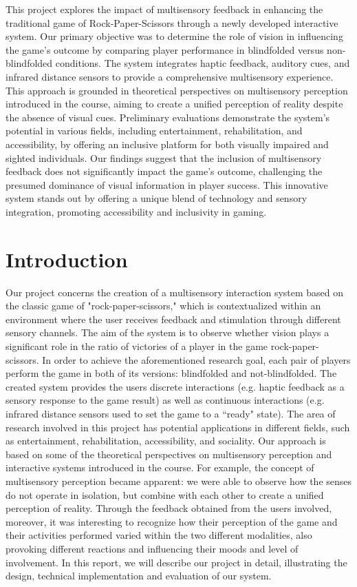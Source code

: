 \documentclass[11pt,a4paper]{report}
\begin{document}
This project explores the impact of multisensory feedback in enhancing the traditional game of Rock-Paper-Scissors through a newly developed interactive system. Our primary objective was to determine the role of vision in influencing the game's outcome by comparing player performance in blindfolded versus non-blindfolded conditions. The system integrates haptic feedback, auditory cues, and infrared distance sensors to provide a comprehensive multisensory experience. This approach is grounded in theoretical perspectives on multisensory perception introduced in the course, aiming to create a unified perception of reality despite the absence of visual cues. Preliminary evaluations demonstrate the system's potential in various fields, including entertainment, rehabilitation, and accessibility, by offering an inclusive platform for both visually impaired and sighted individuals. Our findings suggest that the inclusion of multisensory feedback does not significantly impact the game's outcome, challenging the presumed dominance of visual information in player success. This innovative system stands out by offering a unique blend of technology and sensory integration, promoting accessibility and inclusivity in gaming.

\section*{Introduction}
Our project concerns the creation of a multisensory interaction system based on the classic game of "rock-paper-scissors," which is contextualized within an environment where the user receives feedback and stimulation through different sensory channels. The aim of the system is to observe whether vision plays a significant role in the ratio of victories of a player in the game rock-paper-scissors. In order to achieve the aforementioned research goal, each pair of players perform the game in both of its versions: blindfolded and not-blindfolded. 
The created system provides the users discrete interactions (e.g. haptic feedback as a sensory response to the game result) as well as continuous interactions (e.g. infrared distance sensors used to set the game to a “ready" state).
The area of research involved in this project has potential applications in different fields, such as entertainment, rehabilitation, accessibility, and sociality.
Our approach is based on some of the theoretical perspectives on multisensory perception and interactive systems introduced in the course.
For example, the concept of multisensory perception became apparent: we were able to observe how the senses do not operate in isolation, but combine with each other to create a unified perception of reality.
Through the feedback obtained from the users involved, moreover, it was interesting to recognize how their perception of the game and their activities performed varied within the two different modalities, also provoking different reactions and influencing their moods and level of involvement.
In this report, we will describe our project in detail, illustrating the design, technical implementation and evaluation of our system.
\end{document}
